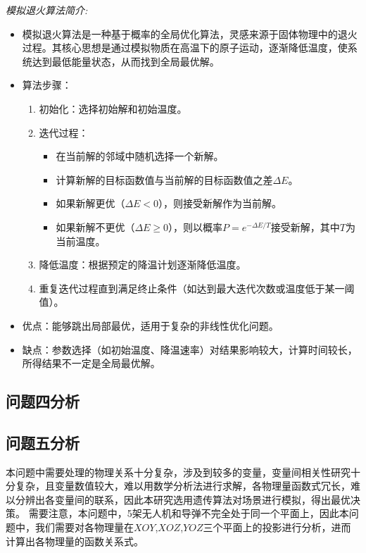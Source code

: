 \documentclass{article}
\begin{document}
\textit{模拟退火算法简介:}
\begin{itemize}
    \item 模拟退火算法是一种基于概率的全局优化算法，灵感来源于固体物理中的退火过程。其核心思想是通过模拟物质在高温下的原子运动，逐渐降低温度，使系统达到最低能量状态，从而找到全局最优解。
    \item 算法步骤：
    \begin{enumerate}
        \item 初始化：选择初始解和初始温度。
        \item 迭代过程：
        \begin{itemize}
            \item 在当前解的邻域中随机选择一个新解。
            \item 计算新解的目标函数值与当前解的目标函数值之差$\Delta E$。
            \item 如果新解更优（$\Delta E < 0$），则接受新解作为当前解。
            \item 如果新解不更优（$\Delta E \geq 0$），则以概率$P = e^{-\Delta E / T}$接受新解，其中$T$为当前温度。
        \end{itemize}
        \item 降低温度：根据预定的降温计划逐渐降低温度。
        \item 重复迭代过程直到满足终止条件（如达到最大迭代次数或温度低于某一阈值）。
    \end{enumerate}
    \item 优点：能够跳出局部最优，适用于复杂的非线性优化问题。
    \item 缺点：参数选择（如初始温度、降温速率）对结果影响较大，计算时间较长，所得结果不一定是全局最优解。
\end{itemize}

\subsection{问题四分析}

\subsection{问题五分析}
本问题中需要处理的物理关系十分复杂，涉及到较多的变量，变量间相关性研究十分复杂，且变量数值较大，难以用数学分析法进行求解，各物理量函数式冗长，难以分辨出各变量间的联系，因此本研究选用遗传算法对场景进行模拟，得出最优决策。
需要注意，本问题中，5架无人机和导弹不完全处于同一个平面上，因此本问题中，我们需要对各物理量在$XOY$,$XOZ$,$YOZ$三个平面上的投影进行分析，进而计算出各物理量的函数关系式。
\end{document}
